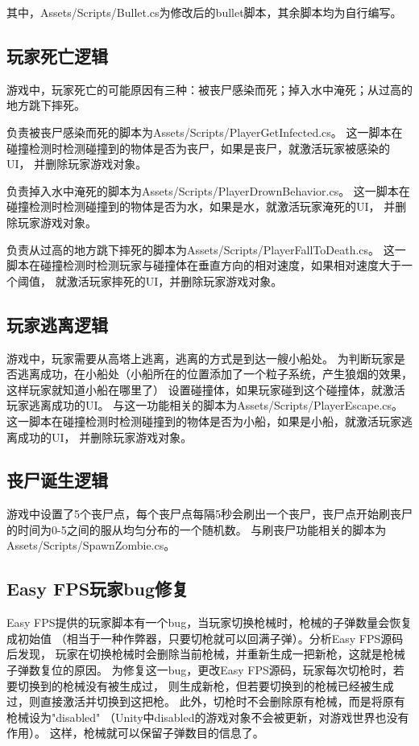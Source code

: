 \documentclass{article}
\begin{document}
其中，Assets/Scripts/Bullet.cs为修改后的bullet脚本，其余脚本均为自行编写。

\subsection{玩家死亡逻辑}

游戏中，玩家死亡的可能原因有三种：被丧尸感染而死；掉入水中淹死；从过高的地方跳下摔死。

负责被丧尸感染而死的脚本为Assets/Scripts/PlayerGetInfected.cs。
这一脚本在碰撞检测时检测碰撞到的物体是否为丧尸，如果是丧尸，就激活玩家被感染的UI，
并删除玩家游戏对象。

负责掉入水中淹死的脚本为Assets/Scripts/PlayerDrownBehavior.cs。
这一脚本在碰撞检测时检测碰撞到的物体是否为水，如果是水，就激活玩家淹死的UI，
并删除玩家游戏对象。

负责从过高的地方跳下摔死的脚本为Assets/Scripts/PlayerFallToDeath.cs。
这一脚本在碰撞检测时检测玩家与碰撞体在垂直方向的相对速度，如果相对速度大于一个阈值，
就激活玩家摔死的UI，并删除玩家游戏对象。

\subsection{玩家逃离逻辑}

游戏中，玩家需要从高塔上逃离，逃离的方式是到达一艘小船处。
为判断玩家是否逃离成功，在小船处（小船所在的位置添加了一个粒子系统，产生狼烟的效果，这样玩家就知道小船在哪里了）
设置碰撞体，如果玩家碰到这个碰撞体，就激活玩家逃离成功的UI。
与这一功能相关的脚本为Assets/Scripts/PlayerEscape.cs。
这一脚本在碰撞检测时检测碰撞到的物体是否为小船，如果是小船，就激活玩家逃离成功的UI，
并删除玩家游戏对象。

\subsection{丧尸诞生逻辑}

游戏中设置了5个丧尸点，每个丧尸点每隔5秒会刷出一个丧尸，丧尸点开始刷丧尸的时间为0-5之间的服从均匀分布的一个随机数。
与刷丧尸功能相关的脚本为Assets/Scripts/SpawnZombie.cs。

\subsection{Easy FPS玩家bug修复}

Easy FPS提供的玩家脚本有一个bug，当玩家切换枪械时，枪械的子弹数量会恢复成初始值
（相当于一种作弊器，只要切枪就可以回满子弹）。分析Easy FPS源码后发现，
玩家在切换枪械时会删除当前枪械，并重新生成一把新枪，这就是枪械子弹数复位的原因。
为修复这一bug，更改Easy FPS源码，玩家每次切枪时，若要切换到的枪械没有被生成过，
则生成新枪，但若要切换到的枪械已经被生成过，则直接激活并切换到这把枪。
此外，切枪时不会删除原有枪械，而是将原有枪械设为"disabled"
（Unity中disabled的游戏对象不会被更新，对游戏世界也没有作用）。
这样，枪械就可以保留子弹数目的信息了。
\end{document}
